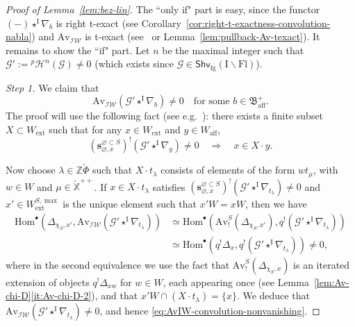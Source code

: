 \documentclass[11pt]{amsart}
\numberwithin{equation}{section}
\theoremstyle{plain}
\theoremstyle{definition}
\newcommand{\sG}{{\mathcal G}}
\newcommand{\sH}{{\mathcal H}}
\newcommand{\I}{{\mathrm I}}
\newcommand{\X}{{\mathbb X}}
\newcommand{\Xd}{\check{\X}}
\newcommand{\Z}{{\mathbb Z}}
\newcommand{\Hom}{\mathrm{Hom}}
\newcommand{\Av}{\mathrm{Av}}
\newcommand{\IW}{\mathcal{IW}}
\newcommand{\ex}{\mathrm{ext}}
\newcommand{\af}{\mathrm{aff}}
\newcommand{\Shvfg}{\mathsf{Shv}_{\mathrm{fg}}}
\newcommand{\Fl}{\mathrm{Fl}}
\begin{document}
\begin{proof}[Proof of Lemma~\ref{lem:bez-lin}]
The ``only if" part is easy, since the functor $(-) \star^{\I}\nabla_b$ is right t-exact (see Corollary~\ref{cor:right-t-exactness-convolution-nabla}) and $\Av_{\IW}$ is t-exact (see~\cite[Lemma~3.2]{AR23} or Lemma~\ref{lem:pullback-Av-texact}). 
It remains to show the ``if" part. 
Let $n$ be the maximal integer such that $\sG':={}^p\sH^n(\sG)\neq 0$ (which exists since $\sG\in \Shvfg(\I\backslash \Fl)$). 

\textit{Step 1.} 
We claim that  
\begin{equation}
\label{eq:AvIW-convolution-nonvanishing}
\Av_\IW(\sG'\star^{\I}\nabla_b) \neq 0 \quad \text{for some $b\in \mathfrak{B}_\af^+$.}
\end{equation}
The proof will use the following fact (see e.g.~\cite[Proposition~4.4.4]{ARbook}): there exists a finite subset $X \subset W_\ex$ such that for any $x\in W_\ex$ and $y\in W_\af$, 
\[
(\mathbf{s}^{\varnothing \subset S}_{\varnothing,x})^!(\sG'\star^{\I}\nabla_{y}) \neq 0 \quad \Rightarrow \quad x\in X \cdot y.
\]

Now choose $\lambda\in \Z\check{\Phi}$ 
such that $X \cdot t_\lambda$ consists of elements of the form $wt_\mu$, with $w\in W$ and $\mu\in \Xd^{++}$.
If $x\in X \cdot t_\lambda$ satisfies $(\mathbf{s}^{\varnothing \subset S}_{\varnothing,x})^!(\sG'\star^\I \nabla_{t_\lambda})\neq 0$ and $x' \in W_\ex^{S,\max}$ is the unique element such that $x'W = xW$, then we have 
\begin{align*}
\Hom^\bullet(\Delta_{\chi_S,x'}, \Av_\IW(\sG'\star^{\I}\nabla_{{t_\lambda}}))
&\simeq \Hom^\bullet(\Av^S_!(\Delta_{\chi_S,x'}), q^!(\sG'\star^{\I}\nabla_{{t_\lambda}}))\\
&\simeq \Hom^\bullet(q^! \Delta_x, q^!(\sG'\star^{\I}\nabla_{{t_\lambda}}))\neq 0,
\end{align*}
where in the second equivalence we use the fact that $\Av^S_!(\Delta_{\chi_S,x})$ is an iterated extension of objects $q^! \Delta_{xw}$ for $w\in W$, each appearing once (see Lemma~\ref{lem:Av-chi-D}\eqref{it:Av-chi-D-2}), and that $x'W \cap (X \cdot t_\lambda)=\{x\}$. 
We deduce that $\Av_\IW(\sG'\star^{\I}\nabla_{{t_\lambda}}) \neq 0$, and hence \eqref{eq:AvIW-convolution-nonvanishing}. 


\end{proof}
\end{document}
